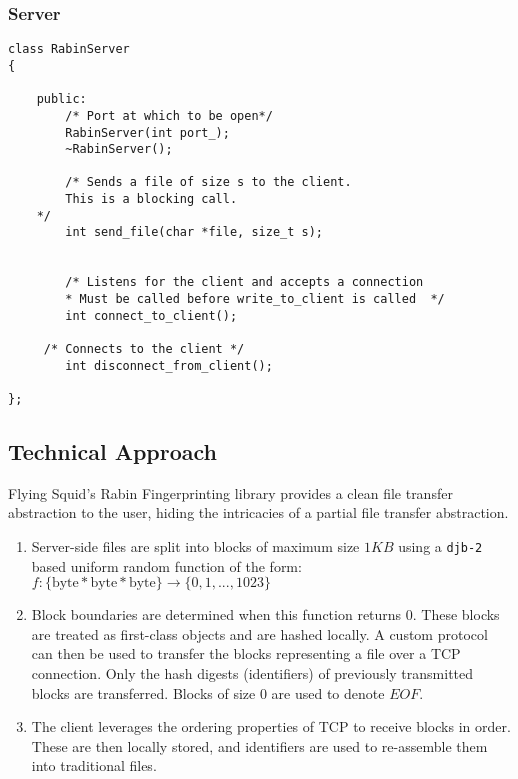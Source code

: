 \subsubsection{Server}

\begin{lstlisting}
class RabinServer
{

    public:
        /* Port at which to be open*/
        RabinServer(int port_);
        ~RabinServer();

        /* Sends a file of size s to the client.
		This is a blocking call.
	*/
        int send_file(char *file, size_t s); 


        /* Listens for the client and accepts a connection 
        * Must be called before write_to_client is called  */
        int connect_to_client();

	 /* Connects to the client */
        int disconnect_from_client();

};

\end{lstlisting}

\subsection{Technical Approach}

Flying Squid's Rabin Fingerprinting library provides a clean file transfer abstraction to the user, hiding the intricacies of a partial file transfer abstraction.

\begin{enumerate}

\item Server-side files are split into blocks of maximum size $1 KB$ using a \verb|djb-2|\cite{djb2} based uniform random function of the form: \\
$f: \{\text{byte} * \text{byte} * \text{byte} \} \rightarrow \{0, 1, ..., 1023\}$
 
\item Block boundaries are determined when this function returns 0. These blocks are treated as first-class objects and are hashed locally. A custom protocol can then be used to transfer the blocks representing a file over a TCP connection. Only the hash digests (identifiers) of previously transmitted blocks are transferred. Blocks of size 0 are used to denote $EOF$.

\item The client  leverages the ordering properties of TCP to receive blocks in order. These are then locally stored, and identifiers are used to re-assemble them into traditional files. 
\end{enumerate}

